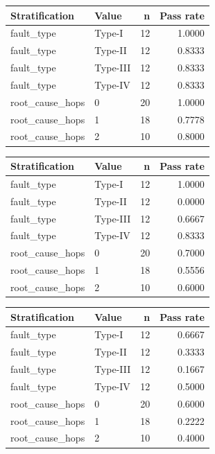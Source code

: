 \begin{table}[ht]
\centering
\begin{tabular}{llrr}
Stratification & Value & n & Pass rate \\
\hline
fault_type & Type-I & 12 & 1.0000 \\
fault_type & Type-II & 12 & 0.8333 \\
fault_type & Type-III & 12 & 0.8333 \\
fault_type & Type-IV & 12 & 0.8333 \\
root_cause_hops & 0 & 20 & 1.0000 \\
root_cause_hops & 1 & 18 & 0.7778 \\
root_cause_hops & 2 & 10 & 0.8000 \\
\end{tabular}
\end{table}
\begin{table}[ht]
\centering
\begin{tabular}{llrr}
Stratification & Value & n & Pass rate \\
\hline
fault_type & Type-I & 12 & 1.0000 \\
fault_type & Type-II & 12 & 0.0000 \\
fault_type & Type-III & 12 & 0.6667 \\
fault_type & Type-IV & 12 & 0.8333 \\
root_cause_hops & 0 & 20 & 0.7000 \\
root_cause_hops & 1 & 18 & 0.5556 \\
root_cause_hops & 2 & 10 & 0.6000 \\
\end{tabular}
\end{table}
\begin{table}[ht]
\centering
\begin{tabular}{llrr}
Stratification & Value & n & Pass rate \\
\hline
fault_type & Type-I & 12 & 0.6667 \\
fault_type & Type-II & 12 & 0.3333 \\
fault_type & Type-III & 12 & 0.1667 \\
fault_type & Type-IV & 12 & 0.5000 \\
root_cause_hops & 0 & 20 & 0.6000 \\
root_cause_hops & 1 & 18 & 0.2222 \\
root_cause_hops & 2 & 10 & 0.4000 \\
\end{tabular}
\end{table}
